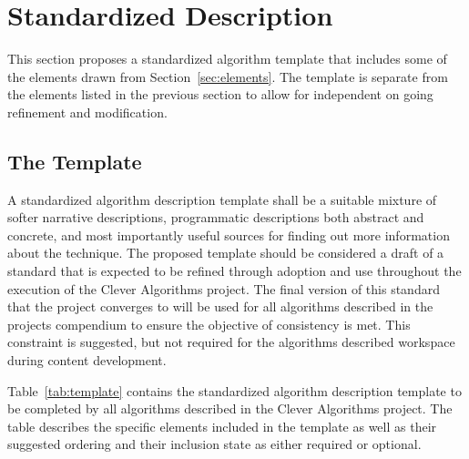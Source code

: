 \documentclass[a4paper, 11pt]{article}
\begin{document}
\section{Standardized Description} 
\label{sec:template}
This section proposes a standardized algorithm template that includes some of the elements drawn from Section~\ref{sec:elements}. The template is separate from the elements listed in the previous section to allow for independent on going refinement and modification.

\subsection{The Template}
A standardized algorithm description template shall be a suitable mixture of softer narrative descriptions, programmatic descriptions both abstract and concrete, and most importantly useful sources for finding out more information about the technique.  
The proposed template should be considered a draft of a standard that is expected to be refined through adoption and use throughout the execution of the Clever Algorithms project. The final version of this standard that the project converges to will be used for all algorithms described in the projects compendium to ensure the objective of consistency is met. This constraint is suggested, but not required for the algorithms described workspace during content development.

Table~\ref{tab:template} contains the standardized algorithm description template to be completed by all algorithms described in the Clever Algorithms project. The table describes the specific elements included in the template as well as their suggested ordering and their inclusion state as either required or optional. 
\end{document}
